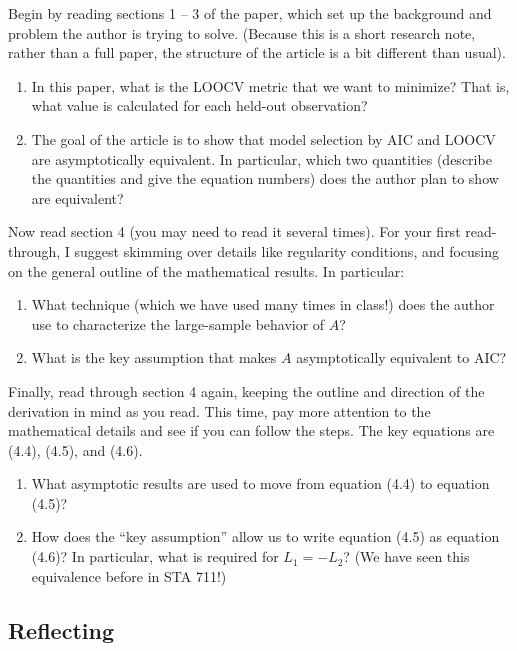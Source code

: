 \documentclass[11pt]{article}
\begin{document}
\noindent Begin by reading sections 1 -- 3 of the paper, which set up the background and problem the author is trying to solve. (Because this is a short research note, rather than a full paper, the structure of the article is a bit different than usual).

\begin{enumerate}
\item In this paper, what is the LOOCV metric that we want to minimize? That is, what value is calculated for each held-out observation?

\item The goal of the article is to show that model selection by AIC and LOOCV are asymptotically equivalent. In particular, which two quantities (describe the quantities and give the equation numbers) does the author plan to show are equivalent?
\end{enumerate}

\noindent Now read section 4 (you may need to read it several times). For your first read-through, I suggest skimming over details like regularity conditions, and focusing on the general outline of the mathematical results. In particular:

\begin{enumerate}
\item What technique (which we have used many times in class!) does the author use to characterize the large-sample behavior of $A$?

\item What is the key assumption that makes $A$ asymptotically equivalent to AIC?
\end{enumerate}

\noindent Finally, read through section 4 again, keeping the outline and direction of the derivation in mind as you read. This time, pay more attention to the mathematical details and see if you can follow the steps. The key equations are (4.4), (4.5), and (4.6).

\begin{enumerate}
\item What asymptotic results are used to move from equation (4.4) to equation (4.5)?

\item How does the ``key assumption'' allow us to write equation (4.5) as equation (4.6)? In particular, what is required for $L_1 = -L_2$? (We have seen this equivalence before in STA 711!)
\end{enumerate}

\subsection*{Reflecting}
\end{document}
